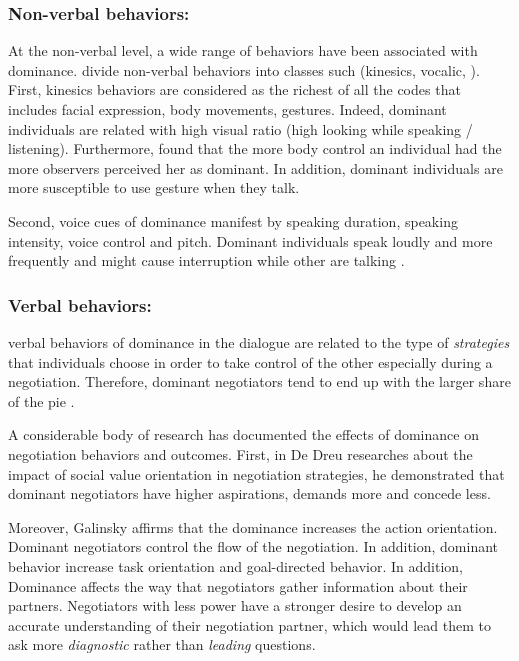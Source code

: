 \documentclass{llncs}
\begin{document}
					\subsubsection{Non-verbal behaviors:}
					At the non-verbal level, a wide range of behaviors have been associated with dominance. \cite{burgoonnonverbal} divide non-verbal behaviors into classes such (kinesics, vocalic, ). First, kinesics behaviors are considered as the richest of all the codes that includes facial expression, body movements, gestures. Indeed, dominant individuals are related with high visual ratio (high looking while speaking / listening).  Furthermore, \cite{burgoonnonverbal} found that the more body control an individual had the more observers perceived her as dominant. In addition, dominant individuals are more susceptible to use gesture when they talk.  
					\par  Second, voice cues of dominance manifest by speaking duration, speaking intensity, voice control and pitch. Dominant individuals speak loudly and more frequently and might cause interruption while other are talking \cite{dunbar2005perceptions}.
					
					\subsubsection{Verbal behaviors:}
					verbal behaviors of dominance in the dialogue are related to the type of \textit{strategies} that individuals choose in order to take control of the other especially during a negotiation. Therefore, dominant negotiators tend to end up with the larger share of the pie \cite{giebels2000interdependence}. 
					\par A considerable body of research has documented the effects of dominance on negotiation behaviors and outcomes. First, in De Dreu researches about the impact of social value orientation in negotiation strategies, he demonstrated that \cite{de1995impact} dominant negotiators have higher aspirations, demands more and concede less. 
					
					 Moreover, Galinsky \cite{galinsky2003power} affirms that the dominance increases the action orientation. Dominant negotiators control the flow of the negotiation. In addition, dominant behavior increase task orientation and goal-directed behavior. In addition, Dominance affects the way that negotiators gather information about their partners. Negotiators with less power have a stronger desire to develop an accurate understanding of their negotiation partner, which would lead them to ask more \emph{diagnostic} rather than \emph{leading} questions.
					 
\end{document}
